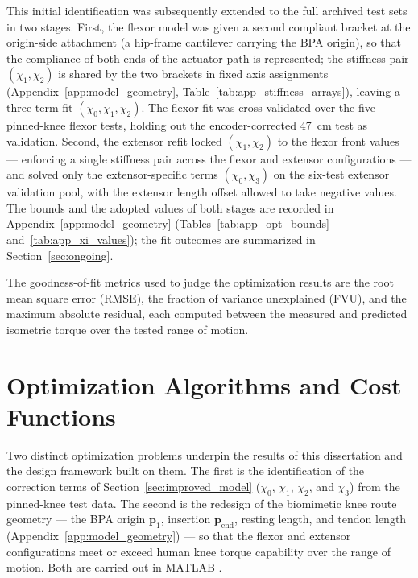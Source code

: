 This initial identification was subsequently extended to the full archived test sets in two stages. First, the flexor model was given a second compliant bracket at the origin-side attachment (a hip-frame cantilever carrying the BPA origin), so that the compliance of both ends of the actuator path is represented; the stiffness pair $(\chi_{1}, \chi_{2})$ is shared by the two brackets in fixed axis assignments (Appendix~\ref{app:model_geometry}, Table~\ref{tab:app_stiffness_arrays}), leaving a three-term fit $(\chi_{0}, \chi_{1}, \chi_{2})$. The flexor fit was cross-validated over the five pinned-knee flexor tests, holding out the encoder-corrected \qty{47}{\cm} test as validation. Second, the extensor refit locked $(\chi_{1}, \chi_{2})$ to the flexor front values --- enforcing a single stiffness pair across the flexor and extensor configurations --- and solved only the extensor-specific terms $(\chi_{0}, \chi_{3})$ on the six-test extensor validation pool, with the extensor length offset allowed to take negative values. The bounds and the adopted values of both stages are recorded in Appendix~\ref{app:model_geometry} (Tables~\ref{tab:app_opt_bounds} and~\ref{tab:app_xi_values}); the fit outcomes are summarized in Section~\ref{sec:ongoing}.

The goodness-of-fit metrics used to judge the optimization results are the root mean square error (RMSE), the fraction of variance unexplained (FVU), and the maximum absolute residual, each computed between the measured and predicted isometric torque over the tested range of motion.

\section{Optimization Algorithms and Cost Functions}\label{sec:optimization}

Two distinct optimization problems underpin the results of this dissertation and the design framework built on them. The first is the identification of the correction terms of Section~\ref{sec:improved_model} ($\chi_{0}$, $\chi_{1}$, $\chi_{2}$, and $\chi_{3}$) from the pinned-knee test data. The second is the redesign of the biomimetic knee route geometry --- the BPA origin $\mathbf{p}_{1}$, insertion $\mathbf{p}_{\text{end}}$, resting length, and tendon length (Appendix~\ref{app:model_geometry}) --- so that the flexor and extensor configurations meet or exceed human knee torque capability over the range of motion. Both are carried out in MATLAB \citep{mathworks_optimization_2025}.

